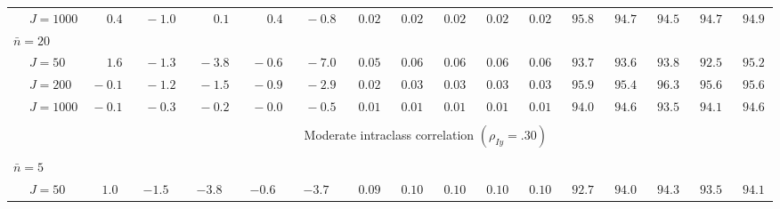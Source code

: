 \begin{sidewaystable}
\begin{threeparttable}
\begin{tabular}{llccccccccccccccc}
 & \nopagebreak $\;J=1000$  & $\phantom{0}\phantom{-}0.4\phantom{0}$ & $\phantom{0}{-}1.0\phantom{0}$ & $\phantom{0}\phantom{-}0.1\phantom{0}$ & $\phantom{0}\phantom{-}0.4\phantom{0}$ & $\phantom{0}{-}0.8\phantom{0}$ & $\phantom{0}0.02\phantom{0}$ & $\phantom{0}0.02\phantom{0}$ & $\phantom{0}0.02\phantom{0}$ & $\phantom{0}0.02\phantom{0}$ & $\phantom{0}0.02\phantom{0}$ & $\phantom{0}95.8\phantom{0}$ & $\phantom{0}94.7\phantom{0}$ & $\phantom{0}94.5\phantom{0}$ & $\phantom{0}94.7\phantom{0}$ & $\phantom{0}94.9\phantom{0}$ \\
\multicolumn{4}{l}{$\bar{n}=20$} \\  & \nopagebreak $\;J=50$  & $\phantom{0}\phantom{-}1.6\phantom{0}$ & $\phantom{0}{-}1.3\phantom{0}$ & $\phantom{0}{-}3.8\phantom{0}$ & $\phantom{0}{-}0.6\phantom{0}$ & $\phantom{0}{-}7.0\phantom{0}$ & $\phantom{0}0.05\phantom{0}$ & $\phantom{0}0.06\phantom{0}$ & $\phantom{0}0.06\phantom{0}$ & $\phantom{0}0.06\phantom{0}$ & $\phantom{0}0.06\phantom{0}$ & $\phantom{0}93.7\phantom{0}$ & $\phantom{0}93.6\phantom{0}$ & $\phantom{0}93.8\phantom{0}$ & $\phantom{0}92.5\phantom{0}$ & $\phantom{0}95.2\phantom{0}$ \\
 & \nopagebreak $\;J=200$  & $\phantom{0}{-}0.1\phantom{0}$ & $\phantom{0}{-}1.2\phantom{0}$ & $\phantom{0}{-}1.5\phantom{0}$ & $\phantom{0}{-}0.9\phantom{0}$ & $\phantom{0}{-}2.9\phantom{0}$ & $\phantom{0}0.02\phantom{0}$ & $\phantom{0}0.03\phantom{0}$ & $\phantom{0}0.03\phantom{0}$ & $\phantom{0}0.03\phantom{0}$ & $\phantom{0}0.03\phantom{0}$ & $\phantom{0}95.9\phantom{0}$ & $\phantom{0}95.4\phantom{0}$ & $\phantom{0}96.3\phantom{0}$ & $\phantom{0}95.6\phantom{0}$ & $\phantom{0}95.6\phantom{0}$ \\
 & \nopagebreak $\;J=1000$  & $\phantom{0}{-}0.1\phantom{0}$ & $\phantom{0}{-}0.3\phantom{0}$ & $\phantom{0}{-}0.2\phantom{0}$ & $\phantom{0}{-}0.0\phantom{0}$ & $\phantom{0}{-}0.5\phantom{0}$ & $\phantom{0}0.01\phantom{0}$ & $\phantom{0}0.01\phantom{0}$ & $\phantom{0}0.01\phantom{0}$ & $\phantom{0}0.01\phantom{0}$ & $\phantom{0}0.01\phantom{0}$ & $\phantom{0}94.0\phantom{0}$ & $\phantom{0}94.6\phantom{0}$ & $\phantom{0}93.5\phantom{0}$ & $\phantom{0}94.1\phantom{0}$ & $\phantom{0}94.6\phantom{0}$ \\
[0.5ex]\hline\\[-1.6ex] 
& & \multicolumn{15}{c}{Moderate intraclass correlation $(\rho_{Iy}=.30)$} \\[0.6ex]\hline\\[-1.8ex]
\multicolumn{4}{l}{$\bar{n}=5$} \\  & \nopagebreak $\;J=50$  & $\phantom{-}1.0\phantom{0}$ & ${-}1.5\phantom{0}$ & ${-}3.8\phantom{0}$ & ${-}0.6\phantom{0}$ & ${-}3.7\phantom{0}$ & $\phantom{0}0.09\phantom{0}$ & $\phantom{0}0.10\phantom{0}$ & $\phantom{0}0.10\phantom{0}$ & $\phantom{0}0.10\phantom{0}$ & $\phantom{0}0.10\phantom{0}$ & $\phantom{0}92.7\phantom{0}$ & $\phantom{0}94.0\phantom{0}$ & $\phantom{0}94.3\phantom{0}$ & $\phantom{0}93.5\phantom{0}$ & $\phantom{0}94.1\phantom{0}$ \\

\end{tabular}
\end{threeparttable}
\end{sidewaystable}
